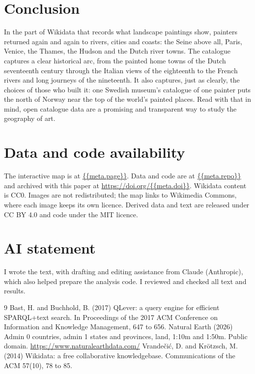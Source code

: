 \documentclass[11pt,a4paper]{article}
\begin{document}
\section{Conclusion}
In the part of Wikidata that records what landscape paintings show, painters returned again and again to rivers, cities and coasts: the Seine above all, Paris, Venice, the Thames, the Hudson and the Dutch river towns. The catalogue captures a clear historical arc, from the painted home towns of the Dutch seventeenth century through the Italian views of the eighteenth to the French rivers and long journeys of the nineteenth. It also captures, just as clearly, the choices of those who built it: one Swedish museum's catalogue of one painter puts the north of Norway near the top of the world's painted places. Read with that in mind, open catalogue data are a promising and transparent way to study the geography of art.

\section*{Data and code availability}
The interactive map is at \url{{{meta.page}}}. Data and code are at \url{{{meta.repo}}} and archived with this paper at \url{https://doi.org/{{meta.doi}}}. Wikidata content is CC0. Images are not redistributed; the map links to Wikimedia Commons, where each image keeps its own licence. Derived data and text are released under CC BY 4.0 and code under the MIT licence.

\section*{AI statement}
I wrote the text, with drafting and editing assistance from Claude (Anthropic), which also helped prepare the analysis code. I reviewed and checked all text and results.

\begin{thebibliography}{9}
 Bast, H. and Buchhold, B. (2017) QLever: a query engine for efficient SPARQL+text search. In Proceedings of the 2017 ACM Conference on Information and Knowledge Management, 647 to 656.
 Natural Earth (2026) Admin 0 countries, admin 1 states and provinces, land, 1:10m and 1:50m. Public domain. \url{https://www.naturalearthdata.com/}
 Vrandečić, D. and Krötzsch, M. (2014) Wikidata: a free collaborative knowledgebase. Communications of the ACM 57(10), 78 to 85.
\end{thebibliography}
\end{document}
